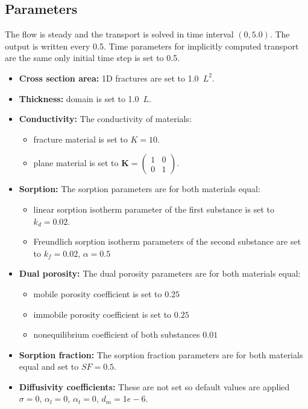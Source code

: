 \subsection*{Parameters}
The flow is steady and the transport is solved in time interval $(0,5.0)$. The output is written every 0.5. Time parameters for implicitly computed transport are the same only initial time step is set to 0.5.
\begin{itemize}
  \item \textbf{Cross section area:} 1D fractures are set to 1.0~$L^2$.
  \item \textbf{Thickness:} domain is set to 1.0~$L$.
  \item \textbf{Conductivity:} The conductivity of materials:
    \begin{itemize}
      \item fracture material is set to $K=10$.
      \item plane material is set to $\mathbf{K}=\left(\begin{array}{cc} 1 & 0 \\ 0 & 1\end{array} \right)$.
    \end{itemize}
  \item \textbf{Sorption:} The sorption parameters are for both materials equal:
    \begin{itemize}
      \item linear sorption isotherm parameter of the first substance is set to $k_d=0.02$.
      \item Freundlich sorption isotherm parameters of the second substance are set to $k_f=0.02$, $\alpha=0.5$  
    \end{itemize}
  \item \textbf{Dual porosity:} The dual porosity parameters are for both materials equal:
    \begin{itemize}
      \item mobile porosity coefficient is set to $0.25$
      \item immobile porosity coefficient is set to $0.25$
      \item nonequilibrium coefficient of both substances $0.01$
    \end{itemize}
  \item \textbf{Sorption fraction:} The sorption fraction parameters are for both materials equal and set to $SF=0.5$.
  \item \textbf{Diffusivity coefficients:} These are not set so default values are applied 
	$\sigma=0$, $\alpha_l=0$, $\alpha_t=0$, $d_m=1e-6$.
\end{itemize}

